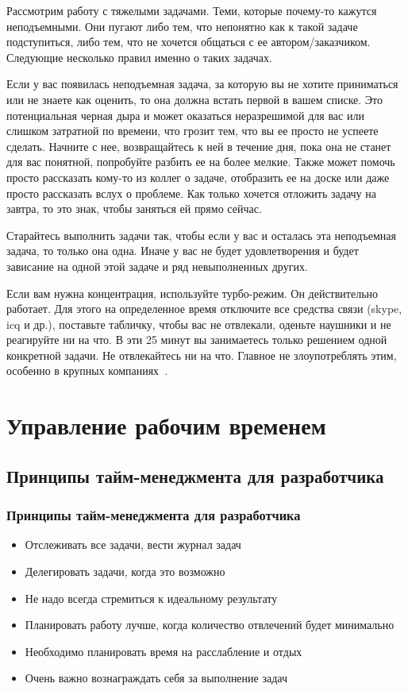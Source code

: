 \documentclass{../industrial-development}
\begin{document}
\lecturenotes

Рассмотрим работу с тяжелыми задачами. Теми, которые почему-то кажутся неподъемными. Они пугают либо тем, что непонятно как к такой задаче подступиться, либо тем, что не хочется общаться с ее автором/заказчиком. Следующие несколько правил именно о таких задачах.

Если у вас появилась неподъемная задача, за которую вы не хотите приниматься или не знаете как оценить, то она должна встать первой в вашем списке. Это потенциальная черная дыра и может оказаться неразрешимой для вас или слишком затратной по времени, что грозит тем, что вы ее просто не успеете сделать. Начните с нее, возвращайтесь к ней в течение дня, пока она не станет для вас понятной, попробуйте разбить ее на более мелкие. 
Также может помочь просто рассказать кому-то из коллег о задаче, отобразить ее на доске или даже просто рассказать вслух о проблеме.
Как только хочется отложить задачу на завтра, то это знак, чтобы заняться ей прямо сейчас.

Старайтесь выполнить задачи так, чтобы если у вас и осталась эта неподъемная задача, то только она одна. Иначе у вас не будет удовлетворения и будет зависание на одной этой задаче и ряд невыполненных других.

Если вам нужна концентрация, используйте турбо-режим. Он действительно работает. Для этого на определенное время отключите все средства связи (skype, icq и др.), поставьте табличку, чтобы вас не отвлекали, оденьте наушники и не реагируйте ни на что. В эти 25 минут вы занимаетесь только решением одной конкретной задачи. Не отвлекайтесь ни на что. Главное не злоупотреблять этим, особенно в крупных компаниях~\cite{TMHabr}.

\section{Управление рабочим временем}

\subsection{Принципы тайм-менеджмента для разработчика}

\begin{frame} \frametitle{Принципы тайм-менеджмента для разработчика}
  \begin{itemize}
  \item Отслеживать все задачи, вести журнал задач
  \item Делегировать задачи, когда это возможно
  \item Не надо всегда стремиться к идеальному результату
  \item Планировать работу лучше, когда количество отвлечений будет минимально
  \item Необходимо планировать время на расслабление и отдых
  \item Очень важно вознаграждать себя за выполнение задач
  \end{itemize}
\end{frame}
\end{document}
